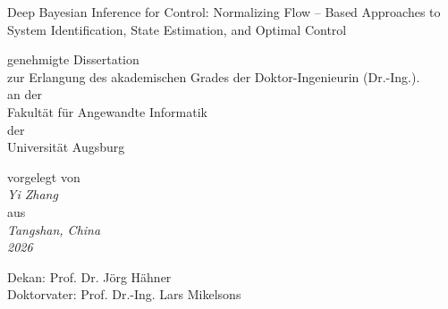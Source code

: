 \begin{center}

    {\Huge \scshape {Deep Bayesian Inference for Control: Normalizing Flow – Based Approaches to System Identification, State Estimation, and Optimal Control \par}} %

    
    \vfill

    genehmigte Dissertation \\
    zur Erlangung des akademischen Grades der Doktor-Ingenieurin (Dr.-Ing.). \\
    an der \\
    Fakultät für Angewandte Informatik \\
    der \\
    Universität Augsburg

    \vfill

    vorgelegt von \\
    \textit{Yi Zhang} \\
    aus \\
    \textit{Tangshan, China} \\
    \bigskip
    \textit{2026}

\end{center}

\newpage
\null\newpage
\vspace*{\fill}
 
\noindent Dekan: Prof. Dr. Jörg Hähner \\
Doktorvater: Prof. Dr.-Ing. Lars Mikelsons 

\newpage
\null\newpage